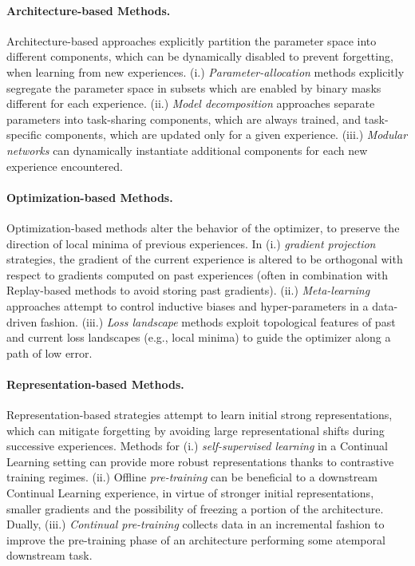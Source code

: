 \paragraph{Architecture-based Methods.} Architecture-based approaches explicitly partition the parameter space into different components, which can be dynamically disabled to prevent forgetting, when learning from new experiences. (i.) \textit{Parameter-allocation} methods explicitly segregate the parameter space in subsets which are enabled by binary masks different for each experience. (ii.) \textit{Model decomposition} approaches separate parameters into task-sharing components, which are always trained, and task-specific components, which are updated only for a given experience. (iii.) \textit{Modular networks} can dynamically instantiate additional components for each new experience encountered.

\paragraph{Optimization-based Methods.} Optimization-based methods alter the behavior of the optimizer, to preserve the direction of local minima of previous experiences.
In (i.) \textit{gradient projection} strategies, the gradient of the current experience is altered to be orthogonal with respect to gradients computed on past experiences (often in combination with Replay-based methods to avoid storing past gradients). (ii.) \textit{Meta-learning} approaches attempt to control inductive biases and hyper-parameters in a data-driven fashion. (iii.) \textit{Loss landscape} methods exploit topological features of past and current loss landscapes (e.g., local minima) to guide the optimizer along a path of low error.

\paragraph{Representation-based Methods.} Representation-based strategies attempt to learn initial strong representations, which can mitigate forgetting by avoiding large representational shifts during successive experiences. Methods for (i.) \textit{self-supervised learning} in a Continual Learning setting can provide more robust representations thanks to contrastive training regimes. (ii.) Offline \textit{pre-training} can be beneficial to a downstream Continual Learning experience, in virtue of stronger initial representations, smaller gradients and the possibility of freezing a portion of the architecture. Dually, (iii.) \textit{Continual pre-training} collects data in an incremental fashion to improve the pre-training phase of an architecture performing some atemporal downstream task.



